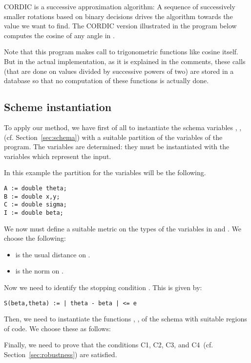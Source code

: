 \documentclass[copyright,creativecommons]{eptcs}
\newcommand{\Cone}{C1}
\newcommand{\Ctwo}{C2}
\newcommand{\Cthree}{C3}
\newcommand{\Cfour}{C4}
\begin{document}
CORDIC is a successive approximation algorithm:  A sequence of
successively smaller rotations based on binary decisions drives the
algorithm towards 
the value we want to find.  The CORDIC version illustrated in the
program below  computes the cosine of any angle in .  

{}
Note that this program makes call to trigonometric functions like
cosine itself. But in the actual implementation, as it is explained in
the comments, these calls (that are done on values divided by successive powers of two) are
stored in a database so that no computation of these functions is actually done.

\subsection{Scheme instantiation}
To apply our method, we have first of all to instantiate the schema variables  , ,   (cf. Section~\ref{sec:schema}) with a suitable partition of the variables of the program.
The variables  are determined: they must be instantiated  with the variables which represent the  
input. 

In this example the partition for the variables will be the
following.

{\begin{lstlisting}
A := double theta;
B := double x,y;
C := double sigma;
I := double beta;
\end{lstlisting}}

We now must define a suitable metric on the types of the  variables in  and . We choose the  following:
\begin{itemize}
\item  is the usual distance on .
\item  is the  norm on .
\end{itemize}

Now we need to identify the stopping condition . This is given by:
\begin{lstlisting}
S(beta,theta) := | theta - beta | <= e
\end{lstlisting}


Then, we need to instantiate the functions , ,  of the schema with suitable regions of code.
We choose these as follows:

{} 

Finally, we need to prove that the conditions \Cone, \Ctwo, \Cthree, and \Cfour \, (cf. Section~\ref{sec:robustness}) are satisfied. 
\end{document}
